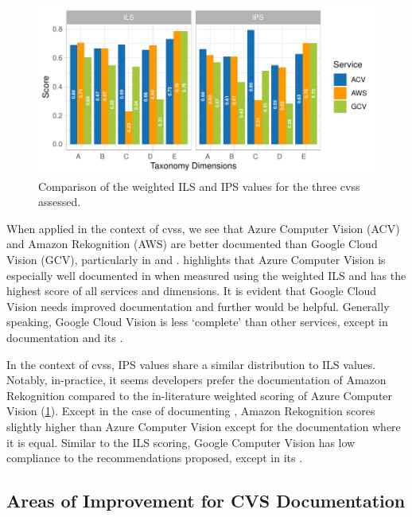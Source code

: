 \begin{figure}[tbh]
  \centering
  \includegraphics[width=\linewidth]{scores2}
  \caption[Comparison of ILS and IPS values]{Comparison of the weighted ILS and IPS values for the three \glspl{cvs} assessed.}
  \label{tse2020:fig:scorecompare}
\end{figure}

When applied in the context of \glspl{cvs}, we see that Azure Computer Vision (ACV) and Amazon Rekognition (AWS) are better documented than Google Cloud Vision (GCV), particularly in \dimb{} and \dima{}.  highlights that Azure Computer Vision is especially well documented in \dimc{} when measured using the weighted ILS and has the highest score of all services and dimensions. It is evident that Google Cloud Vision needs improved \dimb{} documentation and further \dimd{} would be helpful. Generally speaking, Google Cloud Vision is less `complete' than other services, except in \dimc{} documentation and its \dime{}.

In the context of \glspl{cvs}, IPS values share a similar distribution to ILS values. Notably, in-practice, it seems developers prefer the documentation of Amazon Rekognition compared to the in-literature weighted scoring of Azure Computer Vision (\cref{tse2020:fig:scorecompare}). Except in the case of documenting \dimc{}, Amazon Rekognition scores slightly higher than Azure Computer Vision except for the \dimb{} documentation where it is equal. Similar to the ILS scoring, Google Computer Vision has low  compliance to the recommendations proposed, except in its \dime{}.

\subsection{Areas of Improvement for CVS Documentation}
\label{tse2020:sec:tax-analysis:cvs-improvement}

